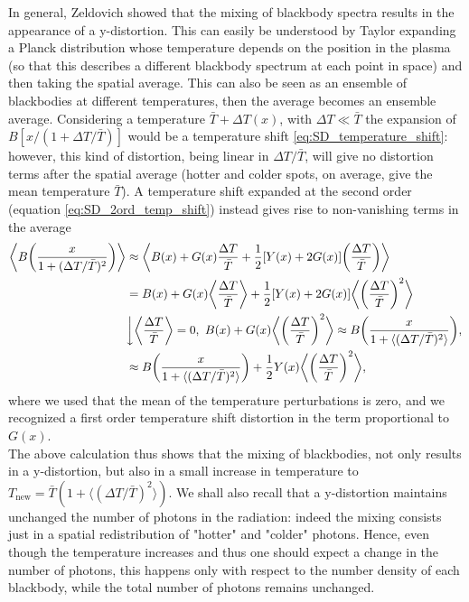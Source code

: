 In general, Zeldovich \cite{Zeldovich1972} showed that the mixing of blackbody spectra results in the appearance of a y-distortion. This can easily be understood by Taylor expanding a Planck distribution whose temperature depends on the position in the plasma (so that this describes a different blackbody spectrum at each point in space) and then taking the spatial average. This can also be seen as an ensemble of blackbodies at different temperatures, then the average becomes an ensemble average. Considering a temperature $\bar{T}+\Delta T(x)$, with $\Delta T\ll\bar{T}$ the expansion of $B[x/(1+\Delta T/\bar T)]$ would be a temperature shift \ref{eq:SD_temperature_shift}: however, this kind of distortion, being linear in $\Delta T/\bar T$, will give no distortion terms after the spatial average (hotter and colder spots, on average, give the mean temperature $\bar T$). A temperature shift expanded at the second order (equation \ref{eq:SD_2ord_temp_shift}) instead gives rise to non-vanishing terms in the average
\begin{align}
     \nonumber\bigg\langle B\bigg(\frac{x}{1+(\Delta T/\bar T)^2}\bigg)\bigg\rangle&\approx\bigg\langle B(x)+G(x)\frac{\Delta T}{\bar T}+\frac{1}{2}[Y(x)+2G(x)]\bigg(\frac{\Delta T}{\bar T}\bigg)\bigg\rangle\\\nonumber
     &=B(x)+G(x)\bigg\langle\frac{\Delta T}{\bar T}\bigg\rangle+\frac{1}{2}[Y(x)+2G(x)]\bigg\langle\bigg(\frac{\Delta T}{\bar T}\bigg)^2\bigg\rangle\\&\bigg\downarrow \bigg\langle\frac{\Delta T}{\bar T}\bigg\rangle=0,\ B(x)+G(x)\bigg\langle\bigg(\frac{\Delta T}{\bar T}\bigg)^2\bigg\rangle\approx B\bigg(\frac{x}{1+\langle(\Delta T/\bar T)^2\rangle}\bigg),\nonumber\\
     &\approx B\bigg(\frac{x}{1+\langle(\Delta T/\bar T)^2\rangle}\bigg)+\frac{1}{2}Y(x)\bigg\langle\bigg(\frac{\Delta T}{\bar T}\bigg)^2\bigg\rangle,\label{eq:Mixing_Y_SD}
\end{align}
where we used that the mean of the temperature perturbations is zero, and we recognized a first order temperature shift distortion in the term proportional to $G(x)$.\\ The above calculation thus shows that the mixing of blackbodies, not only results in a y-distortion, but also in a small increase in temperature to $T_{\text{new}}=\bar T(1+\langle(\Delta T/\bar T)^2\rangle)$. We shall also recall that a y-distortion maintains unchanged the number of photons in the radiation: indeed the mixing consists just in a spatial redistribution of "hotter" and "colder" photons. Hence, even though the temperature increases and thus one should expect a change in the number of photons, this happens only with respect to the number density of each blackbody, while the total number of photons remains unchanged.


